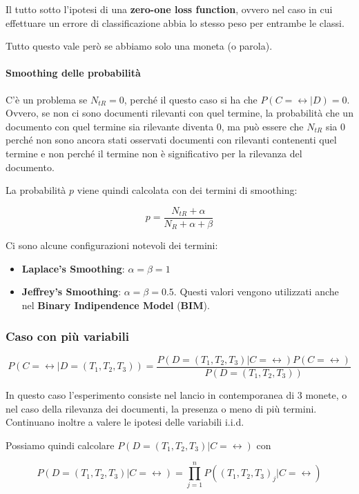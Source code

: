 Il tutto sotto l'ipotesi di una \textbf{zero-one loss function}, ovvero nel caso in cui effettuare un errore di classificazione abbia lo stesso peso per entrambe le classi.

Tutto questo vale però se abbiamo solo una moneta (o parola).

\paragraph{Smoothing delle probabilità} C'è un problema se $N_{tR} = 0$, perché il questo caso si ha che $P(C = \rel | D) = 0$. Ovvero, se non ci sono documenti rilevanti con quel termine, la probabilità che un documento con quel termine sia rilevante diventa 0, ma può essere che $N_{tR}$ sia 0 perché non sono ancora stati osservati documenti con rilevanti contenenti quel termine e non perché il termine non è significativo per la rilevanza del documento.

La probabilità $p$ viene quindi calcolata con dei termini di smoothing:

$$
p = \frac{N_{tR} + \alpha}{N_R + \alpha + \beta}
$$

Ci sono alcune configurazioni notevoli dei termini:

\begin{itemize}
	\item \textbf{Laplace's Smoothing}: $\alpha = \beta = 1$
	\item \textbf{Jeffrey's Smoothing}: $\alpha = \beta = 0.5$. Questi valori vengono utilizzati anche nel \textbf{Binary Indipendence Model} (\textbf{BIM}).
\end{itemize}


\subsubsection{Caso con più variabili}

$$
P(C = \rel | D=(T_1, T_2, T_3)) = \frac{P(D=(T_1,T_2, T_3) | C=\rel)P(C=\rel)}{P(D=(T_1, T_2, T_3))}
$$

\noindent In questo caso l'esperimento consiste nel lancio in contemporanea di 3 monete, o nel caso della rilevanza dei documenti, la presenza o meno di più termini.
Continuano inoltre a valere le ipotesi delle variabili i.i.d.

Possiamo quindi calcolare $P(D=(T_1,T_2, T_3) | C=\rel)$ con

$$
P(D=(T_1,T_2, T_3) | C=\rel) = \prod\limits_{j=1}^{n} P((T_1, T_2,T_3)_j | C = \rel)
$$

